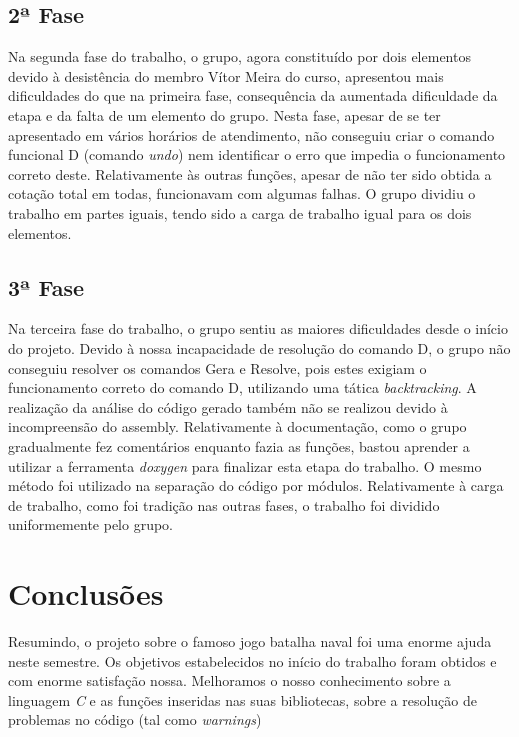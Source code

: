 \documentclass[a4paper,12pt,portuges]{article}
\begin{document}
\subsection{2ª Fase}

Na segunda fase do trabalho, o grupo, agora constituído por dois elementos devido à desistência do membro Vítor Meira do curso, apresentou mais dificuldades do que na primeira fase, consequência da aumentada dificuldade da etapa e da falta de um elemento do grupo. Nesta fase, apesar de se ter apresentado em vários horários de atendimento, não conseguiu criar o comando funcional D (comando \textit{undo}) nem identificar o erro que impedia o funcionamento correto deste. Relativamente às outras funções, apesar de não ter sido obtida a cotação total em todas, funcionavam com algumas falhas.
O grupo dividiu o trabalho em partes iguais, tendo sido a carga de trabalho igual para os dois elementos.
 
\subsection{3ª Fase}

Na terceira fase do trabalho, o grupo sentiu as maiores dificuldades desde o início do projeto. Devido à nossa incapacidade de resolução do comando D, o grupo não conseguiu resolver os comandos Gera e Resolve, pois estes exigiam o funcionamento correto do comando D, utilizando uma tática \textit{backtracking}. A realização da análise do código gerado também não se realizou devido à incompreensão do assembly.
Relativamente à documentação, como o grupo gradualmente fez comentários enquanto fazia as funções, bastou aprender a utilizar a ferramenta \textit{doxygen} para finalizar esta etapa do trabalho. O mesmo método foi utilizado na separação do código por módulos.
Relativamente à carga de trabalho, como foi tradição nas outras fases, o trabalho foi dividido uniformemente pelo grupo.


\newpage

\section{Conclusões}

Resumindo, o projeto sobre o famoso jogo batalha naval foi uma enorme ajuda neste semestre.
Os objetivos estabelecidos no início do trabalho foram obtidos e com enorme satisfação nossa. Melhoramos o nosso conhecimento sobre a linguagem \textit{C} e as funções inseridas nas suas bibliotecas, sobre a resolução de problemas no código (tal como \textit{warnings})
\end{document}
